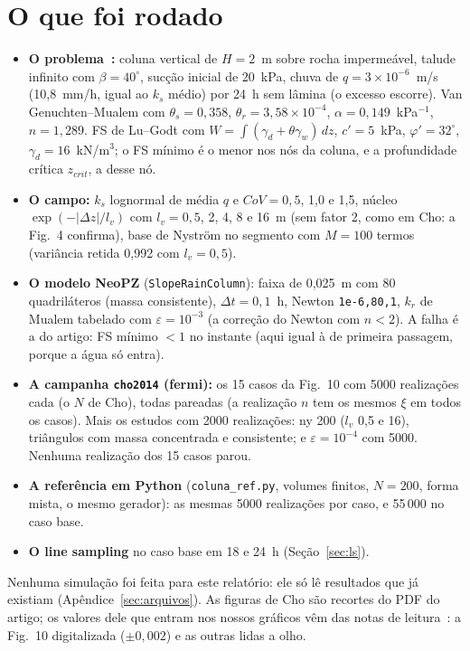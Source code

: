 \documentclass[11pt,a4paper]{article}
\begin{document}
\section{O que foi rodado}\label{sec:rodado}
\begin{itemize}
  \item \textbf{O problema~\cite{cho2014}:} coluna vertical de $H = 2$~m sobre rocha impermeável, talude infinito com
    $\beta = 40^\circ$, sucção inicial de 20~kPa, chuva de $q = 3\times10^{-6}$~m/s (10,8~mm/h, igual ao $k_s$ médio)
    por 24~h sem lâmina (o excesso escorre). Van Genuchten--Mualem com $\theta_s = 0{,}358$, $\theta_r = 3{,}58\times10^{-4}$,
    $\alpha = 0{,}149$~kPa$^{-1}$, $n = 1{,}289$. FS de Lu--Godt com $W = \int (\gamma_d + \theta\gamma_w)\,dz$, $c' = 5$~kPa,
    $\varphi' = 32^\circ$, $\gamma_d = 16$~kN/m$^3$; o FS mínimo é o menor nos nós da coluna, e a profundidade crítica
    $z_{crit}$, a desse nó.
  \item \textbf{O campo:} $k_s$ lognormal de média $q$ e $CoV = 0{,}5$, 1,0 e 1,5, núcleo $\exp(-|\Delta z|/l_v)$ com
    $l_v = 0{,}5$, 2, 4, 8 e 16~m (sem fator 2, como em Cho: a Fig.~4 confirma), base de Nyström no segmento com
    $M = 100$ termos (variância retida 0,992 com $l_v = 0{,}5$).
  \item \textbf{O modelo NeoPZ} (\texttt{SlopeRainColumn}): faixa de 0,025~m com 80 quadriláteros (massa consistente),
    $\Delta t = 0{,}1$~h, Newton \texttt{1e-6,80,1}, $k_r$ de Mualem tabelado com $\varepsilon = 10^{-3}$ (a correção do
    Newton com $n < 2$). A falha é a do artigo: FS mínimo $< 1$ no instante (aqui igual à de primeira passagem, porque a
    água só entra).
  \item \textbf{A campanha \texttt{cho2014} (fermi):} os 15 casos da Fig.~10 com 5000 realizações cada (o $N$ de Cho),
    todas pareadas (a realização $n$ tem os mesmos $\xi$ em todos os casos). Mais os estudos com 2000 realizações:
    ny 200 ($l_v$ 0,5 e 16), triângulos com massa concentrada e consistente; e $\varepsilon = 10^{-4}$ com 5000.
    Nenhuma realização dos 15 casos parou.
  \item \textbf{A referência em Python} (\texttt{coluna\_ref.py}, volumes finitos, $N = 200$, forma mista, o mesmo
    gerador): as mesmas 5000 realizações por caso, e 55\,000 no caso base.
  \item \textbf{O line sampling} no caso base em 18 e 24~h (Seção~\ref{sec:ls}).
\end{itemize}
Nenhuma simulação foi feita para este relatório: ele só lê resultados que já existiam
(Apêndice~\ref{sec:arquivos}). As figuras de Cho são recortes do PDF do artigo; os valores dele que entram nos nossos
gráficos vêm das notas de leitura~\cite{notas}: a Fig.~10 digitalizada ($\pm 0{,}002$) e as outras lidas a olho.
\end{document}
